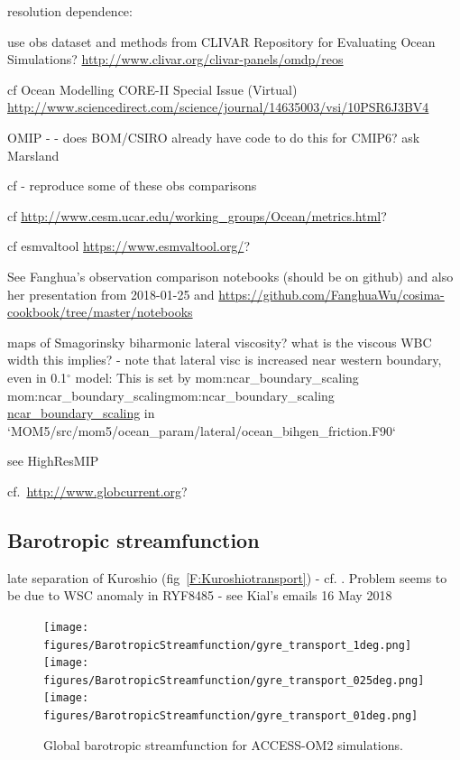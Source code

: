 \documentclass[11pt]{article}
\makeatletter
\newcommand*{\make@hex@label}[1]{%
  \def\hex@label{#1}%
  \@onelevel@sanitize\hex@label
  \EdefEscapeHex\hex@label{\hex@label}%
}
\newcommand*{\hexhyperlink}[2]{%
  \make@hex@label{#1}%
  \hyperlink{\hex@label}{#2}%
}
\newcommand{\momlink}[2]{\hexhyperlink{mom:#2}{#1}}
\newcommand{\param}[1]{\textsf{#1}}
\newcommand{\mom}[1]{\param{\momlink{#1}{#1}}}
\makeatother
\begin{document}
resolution dependence: \citet{KirtmanETAL2012a}

use obs dataset and methods from CLIVAR Repository for Evaluating Ocean Simulations? \url{http://www.clivar.org/clivar-panels/omdp/reos}
 
 cf Ocean Modelling CORE-II Special Issue (Virtual) \url{http://www.sciencedirect.com/science/journal/14635003/vsi/10PSR6J3BV4}

OMIP - \citet{GriffiesETAL2016a} - does BOM/CSIRO already have code to do this for CMIP6? ask Marsland

cf \citet{OkeETAL2013a} - reproduce some of these obs comparisons

cf \url{http://www.cesm.ucar.edu/working_groups/Ocean/metrics.html}?

cf esmvaltool \url{https://www.esmvaltool.org/}?

See Fanghua's observation comparison notebooks (should be on github) and also her presentation from 2018-01-25
and \url{https://github.com/FanghuaWu/cosima-cookbook/tree/master/notebooks}

maps of Smagorinsky biharmonic lateral viscosity? what is the viscous WBC width this implies?
- note that lateral visc is increased near western boundary, even in 0.1$^\circ$ model:  This is set by \mom{ncar_boundary_scaling} in `MOM5/src/mom5/ocean_param/lateral/ocean_bihgen_friction.F90`

see HighResMIP \citep{HaarsmaETAL2016a}

cf.\ \url{http://www.globcurrent.org}?

\subsection{Barotropic streamfunction}
late separation of Kuroshio (fig~\ref{F:Kuroshiotransport}) - cf. \citet{ColindeVerdiereOllitrault2016a}.
Problem seems to be due to WSC anomaly in RYF8485 - see Kial's emails 16 May 2018

\begin{figure}[htp]
\texttt{[image: figures/BarotropicStreamfunction/gyre\_transport\_1deg.png]}\\
\texttt{[image: figures/BarotropicStreamfunction/gyre\_transport\_025deg.png]}\\
\texttt{[image: figures/BarotropicStreamfunction/gyre\_transport\_01deg.png]}
\caption{Global barotropic streamfunction for ACCESS-OM2 simulations.}
\label{F:gyretransport}
\end{figure}
\end{document}

